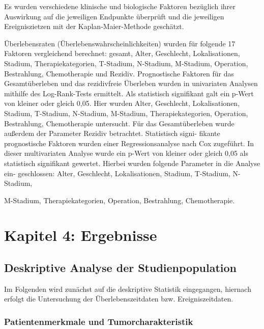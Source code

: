 Es wurden verschiedene klinische und biologische Faktoren bezüglich ihrer Auswirkung auf die jeweiligen Endpunkte überprüft und die jeweiligen Ereigniszietzen mit der Kaplan-Maier-Methode geschätzt.

Überlebensraten (Überlebenswahrscheinlichkeiten) wurden für folgende 17 Faktoren vergleichend berechnet: gesamt, Alter, Geschlecht, Lokalisationen, Stadium, Therapiekategorien, T-Stadium, N-Stadium, M-Stadium, Operation, Bestrahlung, Chemotherapie und Rezidiv. Prognostische Faktoren für das Gesamtüberleben und das rezidivfreie Überleben wurden in univariaten Analysen mithilfe des Log-Rank-Tests ermittelt. Als statistisch signifikant galt ein p-Wert von kleiner oder gleich 0,05. Hier wurden Alter, Geschlecht, Lokalisationen, Stadium, T-Stadium, N-Stadium, M-Stadium, Therapiekategorien, Operation, Bestrahlung, Chemotherapie untersucht. Für das Gesamtüberleben wurde außerdem der Parameter Rezidiv betrachtet. Statistisch signi- fikante prognostische Faktoren wurden einer Regressionsanalyse nach Cox zugeführt. In dieser multivariaten Analyse wurde ein p-Wert von kleiner oder gleich 0,05 als statistisch signifikant gewertet. Hierbei wurden folgende Parameter in die Analyse ein- geschlossen: Alter, Geschlecht, Lokalisationen, Stadium, T-Stadium, N-Stadium,

M-Stadium, Therapiekategorien, Operation, Bestrahlung, Chemotherapie.

\hypertarget{kapitel-4-ergebnisse}{%
\section{Kapitel 4: Ergebnisse}\label{kapitel-4-ergebnisse}}

\hypertarget{deskriptive-analyse-der-studienpopulation}{%
\subsection{Deskriptive Analyse der Studienpopulation}\label{deskriptive-analyse-der-studienpopulation}}

Im Folgenden wird zunächst auf die deskriptive Statistik eingegangen, hiernach erfolgt die Untersuchung der Überlebenszeitdaten bzw. Ereigniszeitdaten.

\hypertarget{patientenmerkmale-und-tumorcharakteristik}{%
\subsubsection{Patientenmerkmale und Tumorcharakteristik}\label{patientenmerkmale-und-tumorcharakteristik}}

